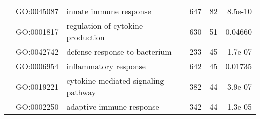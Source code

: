 \documentclass[../main.tex]{subfiles}
\begin{document}
\begin{landscape}
\begin{longtable}{@{}lllccr@{}}
		                                               & GO:0045087                         & innate immune response                                                    & 647                                                                & 82                                                                   & 8.5e-10                                                                                  \\
		                                               & GO:0001817                         & regulation of cytokine production                                         & 630                                                                & 51                                                                   & 0.04660                                                                                  \\
		                                               & GO:0042742                         & defense response to bacterium                                             & 233                                                                & 45                                                                   & 1.7e-07                                                                                  \\
		                                               & GO:0006954                         & inflammatory response                                                     & 642                                                                & 45                                                                   & 0.01735                                                                                  \\
		                                               & GO:0019221                         & cytokine-mediated signaling pathway                                       & 382                                                                & 44                                                                   & 3.9e-07                                                                                  \\
		                                               & GO:0002250                         & adaptive immune response                                                  & 342                                                                & 44                                                                   & 1.3e-05                                                                                  \\

\end{longtable}
\end{landscape}
\end{document}
